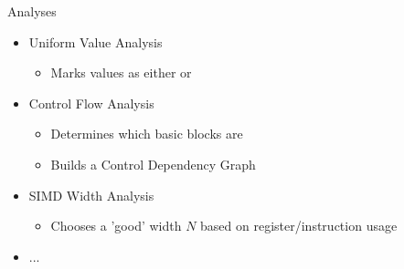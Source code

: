 \begin{frame}{Analyses}

\begin{itemize}
    \item Uniform Value Analysis
    \begin{itemize}
        \item Marks values as either  or 
    \end{itemize}

    \item Control Flow Analysis
    \begin{itemize}
        \item Determines which basic blocks are 
        \item Builds a Control Dependency Graph
    \end{itemize}
    
    \item SIMD Width Analysis
    \begin{itemize}
        \item Chooses a 'good' width $N$ based on register/instruction usage
    \end{itemize}
    
    \item ...
\end{itemize}

\end{frame}


